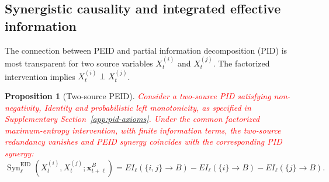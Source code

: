 \documentclass[fleqn,10pt]{wlscirep}
\newcommand{\rev}[1]{\textcolor{red}{#1}}
\theoremstyle{naturetheorem}
\newtheorem{proposition}{Proposition}
\begin{document}
\subsection*{Synergistic causality and integrated effective information}

The connection between PEID and partial information decomposition (PID)
\cite{Williams2010NonnegativeDO} is most transparent for two source variables
\(X_t^{(i)}\) and \(X_t^{(j)}\). The factorized intervention implies
\(X_t^{(i)}\perp X_t^{(j)}\).

\begin{proposition}[Two-source PEID]
\label{prop:two_source_pid}
\rev{Consider a two-source PID satisfying non-negativity, Identity and probabilistic left monotonicity, as specified in Supplementary Section~\ref{app:pid-axioms}. Under the common factorized maximum-entropy intervention, with finite information terms, the two-source redundancy vanishes and PEID synergy coincides with the corresponding PID synergy:}
\begin{equation}
    \operatorname{Syn}^{\mathrm{EID}}_{\ell}
    \left(
        X_t^{(i)},X_t^{(j)};
        \boldsymbol{x}_{t+\ell}^{B}
    \right)
    =
    EI_{\ell}(\{i,j\}\rightarrow B)
    -
    EI_{\ell}(\{i\}\rightarrow B)
    -
    EI_{\ell}(\{j\}\rightarrow B).
    \label{eq:two_source_pid}
\end{equation}
\end{proposition}
\end{document}
